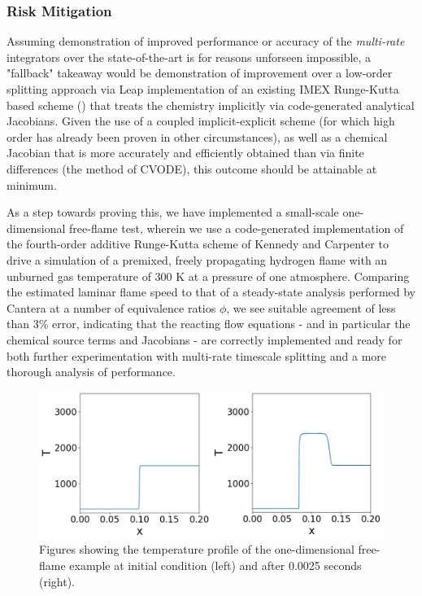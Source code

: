 \subsubsection{Risk Mitigation}

Assuming demonstration of improved
performance or accuracy of the \emph{multi-rate} integrators over the
state-of-the-art is for reasons unforseen impossible, a "fallback" takeaway
would be demonstration of improvement over a low-order splitting
approach via Leap implementation of an existing IMEX Runge-Kutta based scheme
(\cite{kennedy2003additive}) that treats the chemistry implicitly via code-generated
analytical Jacobians. Given the use of a coupled implicit-explicit scheme
(for which high order has already been proven in other circumstances),
as well as a chemical Jacobian that is more accurately and efficiently obtained
than via finite differences (the method of CVODE), this outcome should be attainable
at minimum.

As a step towards proving this, we have implemented a small-scale one-dimensional
free-flame test, wherein we use a code-generated implementation of the fourth-order
additive Runge-Kutta scheme of Kennedy and Carpenter to drive a simulation of
a premixed, freely propagating hydrogen flame with an unburned gas temperature
of 300 K at a pressure of one atmosphere. Comparing the estimated laminar
flame speed to that of a steady-state analysis performed by Cantera at a number
of equivalence ratios $\phi$, we see suitable agreement of less than 3\% error, indicating
that the reacting flow equations - and in particular the chemical source terms and Jacobians -
are correctly implemented and ready for both further experimentation with multi-rate
timescale splitting and a more thorough analysis of performance.
\begin{figure}
\centering
\includegraphics[width=0.8\linewidth,trim=4 4 4 4,clip]{figures/flame_figures.png}
\caption{Figures showing the temperature profile of the one-dimensional free-flame example
         at initial condition (left) and after 0.0025 seconds (right).}
\label{fig:freeflame_output}
\end{figure}

